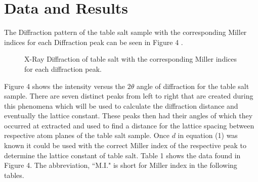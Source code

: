 \documentclass[twocolumn]{article}
\begin{document}
\section*{Data and Results}
The Diffraction pattern of the table salt sample with the corresponding Miller indices for each Diffraction peak can be seen in Figure 4 \cite{Lecture}.
\begin{figure}[htbp]
\begin{center}
\label{Fig4}
\caption{X-Ray Diffraction of table salt with the corresponding Miller indices for each diffraction peak.}
\end{center}
\end{figure}
\newline
Figure 4 shows the intensity versus the $2\theta$ angle of diffraction for the table salt sample. There are seven distinct peaks from left to right that are created during this phenomena which will be used to calculate the diffraction distance and eventually the lattice constant. These peaks then had their angles of which they occurred at extracted and used to find a distance for the lattice spacing between respective atom planes of the table salt sample. Once $d$ in equation (1) was known it could be used with the correct Miller index of the respective peak to determine the lattice constant of table salt. Table 1 shows the data found in Figure 4. The abbreviation, ``M.I." is short for Miller index in the following tables.
\end{document}
